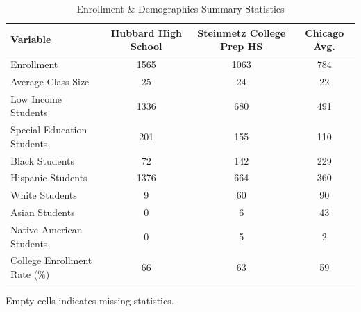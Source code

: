 \begin{table}[H]
\renewcommand{\arraystretch}{1.5}
\caption*{
{\large Enrollment \& Demographics Summary Statistics}
} 

\fontsize{10pt}{11pt}\selectfont

\begin{tabular*}{\linewidth}{@{\extracolsep{\fill}}lccc}
\toprule
Variable & Hubbard High School & Steinmetz College Prep HS & Chicago Avg. \\ 
\midrule\addlinespace[2.5pt]
Enrollment & 1565 & 1063 & 784 \\
Average Class Size & 25 & 24 & 22 \\
Low Income Students & 1336 & 680 & 491 \\
Special Education Students & 201 & 155 & 110 \\
Black Students & 72 & 142 & 229 \\
Hispanic Students & 1376 & 664 & 360 \\
White Students & 9 & 60 & 90 \\
Asian Students & 0 & 6 & 43 \\
Native American Students & 0 & 5 & 2 \\
College Enrollment Rate (\%) & 66 & 63 & 59 \\
\bottomrule
\end{tabular*}
\begin{minipage}{\linewidth}
Empty cells indicates missing statistics.\\
\end{minipage}
\end{table}
